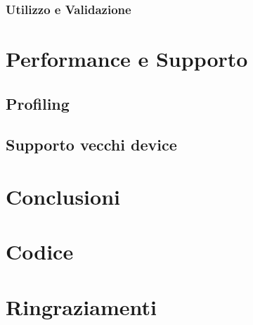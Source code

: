 \documentclass{article}
\begin{document}
\subsubsection{Utilizzo e Validazione}

  \newpage
\section{Performance e Supporto}

\subsection{Profiling}

\subsection{Supporto vecchi device}

  \newpage
\section{Conclusioni}

\newpage
\printbibliography[title=Bibliografia]

  \newpage
  \listoffigures

  \newpage
\section{Codice}

  \newpage
\section{Ringraziamenti}
\end{document}
